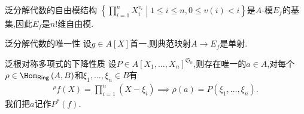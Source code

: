 \begin{proposition}{泛分解代数的自由模结构}{}
	$\left\{\prod\limits_{i=1}^{n}X_{i}^{v_{i}}\middle|1\leq i\leq n,0\leq v\left(i\right)<i\right\}$是$A$-模$E_{f}$的基集,因此$E_{f}$是$n!$维自由模.
\end{proposition}

\begin{corollary}{泛分解代数的唯一性}{}
	设$g\in A[X]$首一,则典范映射$A\to E_{f}$是单射.
\end{corollary}

\begin{proposition}{泛根对称多项式的下降性质}{}
	设$P\in A[X_{1},\ldots,X_{n}]^{\mathfrak{S}_{n}}$,则存在唯一的$a\in A$,对每个$\rho\in\Hom_{\mathsf{Ring}}\left(A,B\right)$和$\xi_{1},\ldots,\xi_{n}\in B$有
	\begin{align*}
		^{\rho}f\left(X\right)=\prod\limits_{i=1}^{n}\left(X-\xi_{i}\right)\implies\rho\left(a\right)=P\left(\xi_{1},\ldots,\xi_{n}\right).
	\end{align*}
	我们把$a$记作$P^{\ast}\left(f\right)$.
\end{proposition}

